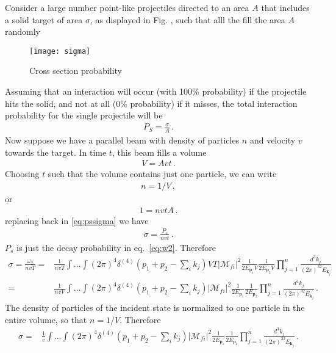 Consider a large number point-like projectiles directed to an area $A$ that includes a solid target of area $\sigma$, as displayed in Fig. \label{fig:sigma}, such that alll the fill the area $A$ randomly
\begin{figure}
  \centering
  \texttt{[image: sigma]}
  \caption{Cross section probability}
  \label{fig:sigma}
\end{figure}
Assuming that an interaction will occur (with 100\% probability) if the projectile hits the solid, and not at all (0\% probability) if it misses, the total interaction probability for the single projectile will be
\begin{align}
  \label{eq:pssigma}
  P_S=\frac{\sigma}{A}\,.
\end{align}
Now suppose we have a parallel beam with density of particles $n$ and velocity $v$ towards the target. In time $t$, this beam fills a volume 
\begin{align}
  V=A v t\,.
\end{align}
Choosing $t$ such that the volume contains just one particle, we can write
\begin{align}
  n=1/V\,,
\end{align}
or
\begin{align}
  1=n v t A\,.
\end{align}
replacing back in \eqref{eq:pssigma} we have
\begin{align}
\sigma=\frac{P_s}{n v t}\,.  
\end{align}
$P_s$ is just the decay probability in eq.~\eqref{eq:w2}. Therefore
\begin{align}
  \sigma=\frac{\omega_2}{n v T}=&
\frac{1}{n v T}\int\ldots\int 
(2\pi)^4\delta^{(4)}\left(p_1+p_2-\sum_i k_j\right)VT 
\left|\mathcal{M}_{fi}\right|^2
\frac{1}{2E_{\mathbf{p}_1}V}\frac{1}{2E_{\mathbf{p}_2}V}
\prod_{j=1}^n\frac{d^3k_j}{(2\pi)^32E_{\mathbf{k}_j}}
\nonumber\\
=&\frac{1}{n v V}\int\ldots\int 
(2\pi)^4\delta^{(4)}\left(p_1+p_2-\sum_i k_j\right)
\left|\mathcal{M}_{fi}\right|^2
\frac{1}{2E_{\mathbf{p}_1}}\frac{1}{2E_{\mathbf{p}_2}}
\prod_{j=1}^n\frac{d^3k_j}{(2\pi)^32E_{\mathbf{k}_j}}\,.
\end{align}
The density of particles of the incident state is normalized to one particle  in the entire volume, so that $n=1/V$. Therefore
\begin{align}
   \sigma=&\frac{1}{v}\int\ldots\int 
(2\pi)^4\delta^{(4)}\left(p_1+p_2-\sum_i k_j\right)
\left|\mathcal{M}_{fi}\right|^2
\frac{1}{2E_{\mathbf{p}_1}}\frac{1}{2E_{\mathbf{p}_2}}
\prod_{j=1}^n\frac{d^3k_j}{(2\pi)^32E_{\mathbf{k}_j}}\,.
\end{align}
